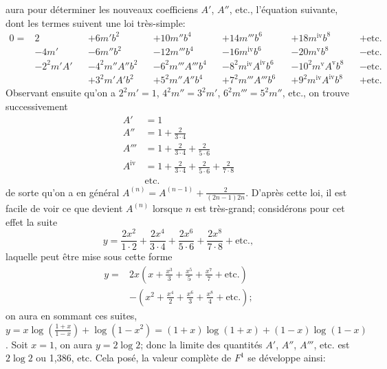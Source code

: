\documentclass{article}
\begin{document}
aura pour déterminer les nouveaux coefficiens $A'$, $A''$, etc., l'équation suivante, dont les termes suivent une loi très-simple:
\[ \begin{aligned} 0={}&2&&+6m'b^{2}&&+10m''b^{4}&&+14m'''b^{6}&&+18m^{\text{iv}}b^{8}&&+\text{etc.}\\ &-4m'&&-6m''b^{2}&&-12m'''b^{4}&&-16m^{\text{iv}}b^{6}&&-20m^{\text{v}}b^{8}&&-\text{etc.}\\ &-2^{2}m'A'&&-4^{2}m''A''b^{2}&&-6^{2}m'''A'''b^{4}&&-8^{2}m^{\text{iv}}A^{\text{iv}}b^{6}&&-10^{2}m^{\text{v}}A^{\text{v}}b^{8}&&-\text{etc.}\\ &&&+3^{2}m'A'b^{2}&&+5^{2}m''A''b^{4}&&+7^{2}m'''A'''b^{6}&&+9^{2}m^{\text{iv}}A^{\text{iv}}b^{8}&&+\text{etc.} \end{aligned} \]
Observant ensuite qu'on a $2^{2}m'=1$, $4^{2}m''=3^{2}m'$, $6^{2}m'''=5^{2}m''$, etc., on trouve successivement
\[ \begin{aligned} A'&=1\\ A''&=1+\frac{2}{3\cdot 4}\\ A'''&=1+\frac{2}{3\cdot 4}+\frac{2}{5\cdot 6}\\ A^{\text{iv}}&=1+\frac{2}{3\cdot 4}+\frac{2}{5\cdot 6}+\frac{2}{7\cdot 8}\\ &\text{etc.} \end{aligned} \]
de sorte qu'on a en général $A^{(n)}=A^{(n-1)}+\frac{2}{(2n-1)2n}$. D'après cette loi, il est facile de voir ce que devient $A^{(n)}$ lorsque $n$ est très-grand; considérons pour cet effet la suite
\[ y=\frac{2x^{2}}{1\cdot 2}+\frac{2x^{4}}{3\cdot 4}+\frac{2x^{6}}{5\cdot 6}+\frac{2x^{8}}{7\cdot 8}+\text{etc.}, \]
laquelle peut être mise sous cette forme
\[ \begin{aligned} y={}&2x\left(x+\frac{x^{3}}{3}+\frac{x^{5}}{5}+\frac{x^{7}}{7}+\text{etc.}\right)\\ &-\left(x^{2}+\frac{x^{4}}{2}+\frac{x^{6}}{3}+\frac{x^{8}}{4}+\text{etc.}\right); \end{aligned} \]
on aura en sommant ces suites, $y=x\log\left(\frac{1+x}{1-x}\right)+\log(1-x^{2})=(1+x)\log(1+x)+(1-x)\log(1-x)$. Soit $x=1$, on aura $y=2\log 2$; donc la limite des quantités $A'$, $A''$, $A'''$, etc. est $2\log 2$ ou 1,386, etc. Cela posé, la valeur complète de $F^{1}$ se développe ainsi:
\end{document}
